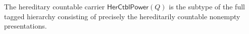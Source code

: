 \begin{definition}
The hereditary countable carrier $\mathsf{HerCtblPower}(Q)$ is the subtype
of the full tagged hierarchy consisting of precisely the hereditarily
countable nonempty presentations.
\end{definition}
